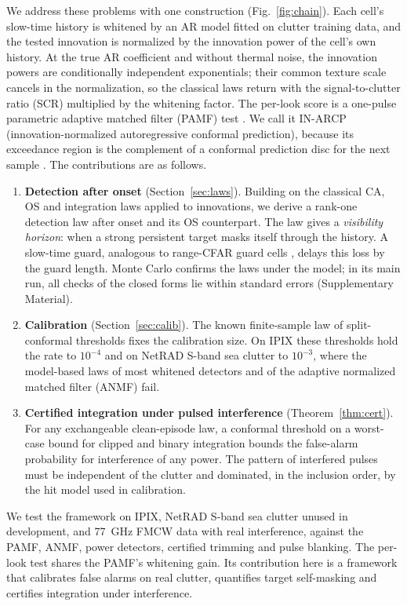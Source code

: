 \documentclass[journal]{IEEEtran}
\begin{document}
We address these problems with one construction (Fig.~\ref{fig:chain}). Each cell's slow-time history is whitened by an AR model fitted on clutter training data, and the tested innovation is normalized by the innovation power of the cell's own history. At the true AR coefficient and without thermal noise, the innovation powers are conditionally independent exponentials; their common texture scale cancels in the normalization, so the classical laws return with the signal-to-clutter ratio (SCR) multiplied by the whitening factor. The per-look score is a one-pulse parametric adaptive matched filter (PAMF) test \cite{roman2000}. We call it IN-ARCP (innovation-normalized autoregressive conformal prediction), because its exceedance region is the complement of a conformal prediction disc for the next sample \cite{lei2018}. The contributions are as follows.
\begin{enumerate}[leftmargin=*,itemsep=2pt]
\item \textbf{Detection after onset} (Section~\ref{sec:laws}). Building on the classical CA, OS and integration laws applied to innovations, we derive a rank-one detection law after onset and its OS counterpart. The law gives a \emph{visibility horizon}: when a strong persistent target masks itself through the history. A slow-time guard, analogous to range-CFAR guard cells \cite{richards2014}, delays this loss by the guard length. Monte Carlo confirms the laws under the model; in its main run, all \NLawChecks{} checks of the closed forms lie within \LawChecksZBound{} standard errors (Supplementary Material).
\item \textbf{Calibration} (Section~\ref{sec:calib}). The known finite-sample law of split-conformal thresholds \cite{vovk2012} fixes the calibration size. On IPIX these thresholds hold the rate to $10^{-4}$ and on NetRAD S-band sea clutter to $10^{-3}$, where the model-based laws of most whitened detectors and of the adaptive normalized matched filter (ANMF) fail.
\item \textbf{Certified integration under pulsed interference} (Theorem~\ref{thm:cert}). For any exchangeable clean-episode law, a conformal threshold on a worst-case bound for clipped \cite{abbasi2018clip} and binary integration bounds the false-alarm probability for interference of any power. The pattern of interfered pulses must be independent of the clutter and dominated, in the inclusion order, by the hit model used in calibration.
\end{enumerate}
We test the framework on IPIX, NetRAD S-band sea clutter unused in development, and 77~GHz FMCW data with real interference, against the PAMF, ANMF, power detectors, certified trimming and pulse blanking. The per-look test shares the PAMF's whitening gain. Its contribution here is a framework that calibrates false alarms on real clutter, quantifies target self-masking and certifies integration under interference.
\end{document}
